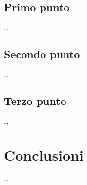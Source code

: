\documentclass[a4paper, 11pt]{article}
\begin{document}
\subsection{Primo punto}

\dots 

\subsection{Secondo punto}

\dots

\subsection{Terzo punto}

\dots

\section{Conclusioni}

\dots
\end{document}

